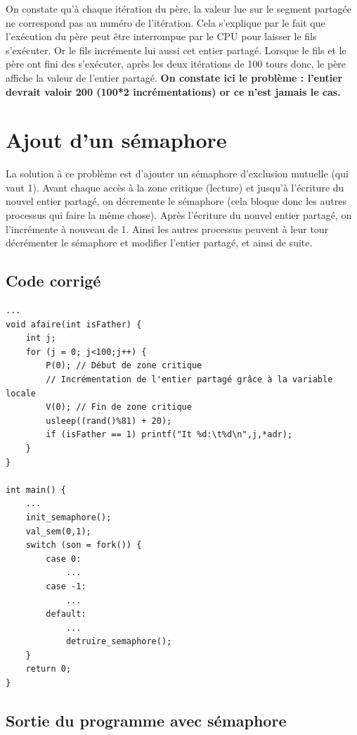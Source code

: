 On constate qu'à chaque itération du père, la valeur lue sur le segment partagée ne correspond pas au numéro de l'itération. Cela s'explique par le fait que l'exécution du père peut être interrompue par le CPU pour laisser le fils s'exécuter. Or le fils incrémente lui aussi cet entier partagé. Lorsque le fils et le père ont fini des s'exécuter, après les deux itérations de 100 tours donc, le père affiche la valeur de l'entier partagé. \textbf{On constate ici le problème : l'entier devrait valoir 200 (100*2 incrémentations) or ce n'est jamais le cas.}

\section{Ajout d'un sémaphore}

La solution à ce problème est d'ajouter un sémaphore d'exclusion mutuelle (qui vaut 1). Avant chaque accès à la zone critique (lecture) et jusqu'à l'écriture du nouvel entier partagé, on décremente le sémaphore (cela bloque donc les autres processus qui faire la même chose). Après l'écriture du nouvel entier partagé, on l'incrémente à nouveau de 1. Ainsi les autres processus peuvent à leur tour décrémenter le sémaphore et modifier l'entier partagé, et ainsi de suite.

\subsection{Code corrigé}

\begin{lstlisting}
...
void afaire(int isFather) {
    int j;
    for (j = 0; j<100;j++) {
        P(0); // Début de zone critique
        // Incrémentation de l'entier partagé grâce à la variable locale
        V(0); // Fin de zone critique
        usleep((rand()%81) + 20);
        if (isFather == 1) printf("It %d:\t%d\n",j,*adr);
    }
}

int main() {
    ...
    init_semaphore();
    val_sem(0,1);
    switch (son = fork()) {
        case 0:
            ...
        case -1:
            ...
        default:
            ...
            detruire_semaphore();
    }
    return 0;
}
\end{lstlisting}

\subsection{Sortie du programme avec sémaphore}

